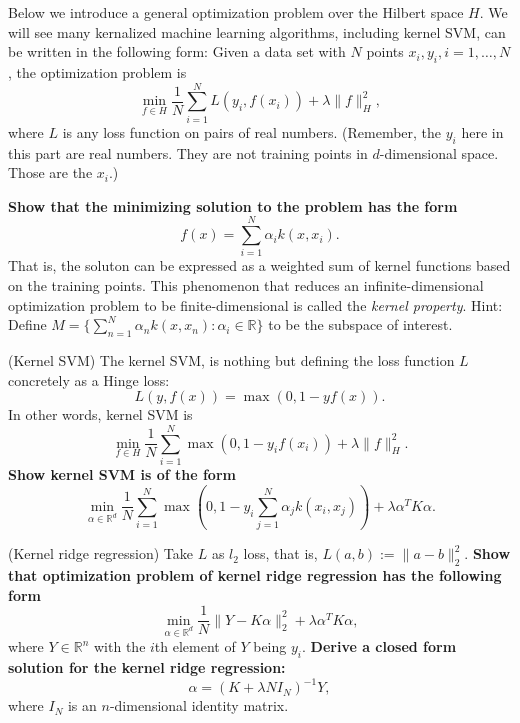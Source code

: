 \begin{Parts}
Below we introduce a general optimization problem over the Hilbert space $H$. We will see many kernalized machine learning algorithms, including kernel SVM, can be written in the following form: Given a data set with $N$ points $x_i,y_i, i=1,\dots,N$, the optimization problem is 
\begin{equation}
\min_{f\in H} \frac 1 N \sum_{i=1}^N L(y_i,f(x_i)) + \lambda \|f\|_{H}^2,
\end{equation}
where $L$ is any loss function on pairs of real numbers. (Remember,
the $y_i$ here in this part are real numbers. They are not training
points in $d$-dimensional space. Those are the $x_i$.)

{\bf Show that the minimizing solution to the problem has the form $$f(x) =
\sum_{i=1}^N \alpha_i k(x,x_i).$$} That is, the soluton can be
expressed as a weighted sum of kernel functions based on the training
points. This phenomenon that reduces an infinite-dimensional
optimization problem to be finite-dimensional is called the
\textit{kernel property}. Hint: Define $M = \{\sum_{n=1}^N\alpha_n
k(x,x_n):\alpha_i\in\mathbb R\}$ to be the subspace of interest.



\Part (Kernel SVM) The kernel SVM, is nothing but defining the loss function $L$ concretely as a Hinge loss: 
\begin{equation}
L(y,f(x)) = \max(0, 1-yf(x)).
\end{equation}
In other words, kernel SVM is 
\begin{equation}
\min_{f\in H}\frac{1}{N}  \sum_{i=1}^N \max(0, 1-y_if(x_i)) +\lambda\|f\|_{H}^2.
\end{equation}
{\bf Show kernel SVM is of the form}
\begin{equation}
\min_{\alpha\in\mathbb R^d} \frac{1}{N} \sum_{i=1}^N \max(0, 1-y_i\sum_{j=1}^N\alpha_j k(x_i,x_j)) +\lambda\alpha^T K\alpha.
\end{equation}




\Part (Kernel ridge regression) Take $L$ as $l_2$ loss, that is,
$L(a,b) := \|a-b\|_2^2$. {\bf Show that optimization problem of kernel ridge regression has the following form }
\begin{equation}
\min_{\alpha\in\mathbb R^d} \frac{1}{N}\|Y-K\alpha\|_2^2 + \lambda \alpha^T K\alpha,
\end{equation}
where $Y\in\mathbb R^n$ with the $i$th element of $Y$ being
$y_i$. {\bf Derive a closed form solution for the kernel ridge regression:}
\begin{equation}
\alpha = (K+\lambda N I_N)^{-1} Y, 
\end{equation}
where $I_N$ is an $n$-dimensional identity matrix. 




\end{Parts}
